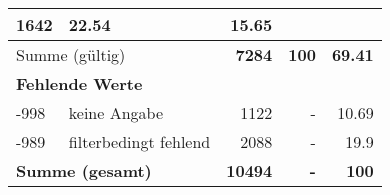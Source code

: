 \begin{longtable}{lXrrr}
       \num{1642} &
       \num[round-mode=places,round-precision=2]{22,54} &
         \num[round-mode=places,round-precision=2]{15,65} \\
     \midrule
     \multicolumn{2}{l}{Summe (gültig)} &
       \textbf{\num{7284}} &
     \textbf{100} &
       \textbf{\num[round-mode=places,round-precision=2]{69,41}} \\
     \multicolumn{5}{l}{\textbf{Fehlende Werte}}\\
       -998 &
       keine Angabe &
         \num{1122} &
        - &
         \num[round-mode=places,round-precision=2]{10,69} \\
       -989 &
       filterbedingt fehlend &
         \num{2088} &
        - &
         \num[round-mode=places,round-precision=2]{19,9} \\
     \midrule
     \multicolumn{2}{l}{\textbf{Summe (gesamt)}} &
          \textbf{\num{10494}} &
        \textbf{-} &
        \textbf{100} \\
     \bottomrule
     \end{longtable}
     

